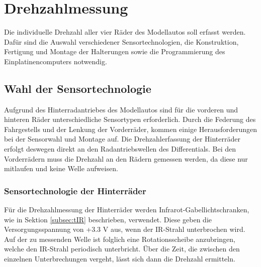 \section{Drehzahlmessung}
\label{sec:RPM}
Die individuelle Drehzahl aller vier Räder des Modellautos soll erfasst werden. Dafür sind die Auswahl verschiedener Sensortechnologien, die Konstruktion, Fertigung und Montage der Halterungen sowie die Programmierung des Einplatinencomputers notwendig.

\subsection{Wahl der Sensortechnologie}
\label{subsec:RPMchoice}
Aufgrund des Hinterradantriebes des Modellautos sind für die vorderen und hinteren Räder unterschiedliche Sensortypen erforderlich. Durch die Federung des Fahrgestells und der Lenkung der Vorderräder, kommen einige Herausforderungen bei der Sensorwahl und Montage auf. Die Drehzahlerfassung der Hinterräder erfolgt deswegen direkt an den Radantriebswellen des Differentials. Bei den Vorderrädern muss die Drehzahl an den Rädern gemessen werden, da diese nur mitlaufen und keine Welle aufweisen.

\subsubsection{Sensortechnologie der Hinterräder}
\label{subsubsec:RPMchoiceRear}
Für die Drehzahlmessung der Hinterräder werden Infrarot-Gabellichtschranken, wie in Sektion \ref{subsec:tIR} beschrieben, verwendet. Diese geben die Versorgungsspannung von +3.3 V aus, wenn der \ac{IR}-Strahl unterbrochen wird. Auf der zu messenden Welle ist folglich eine Rotationsscheibe anzubringen, welche den \ac{IR}-Strahl periodisch unterbricht. Über die Zeit, die zwischen den einzelnen Unterbrechungen vergeht, lässt sich dann die Drehzahl ermitteln.

